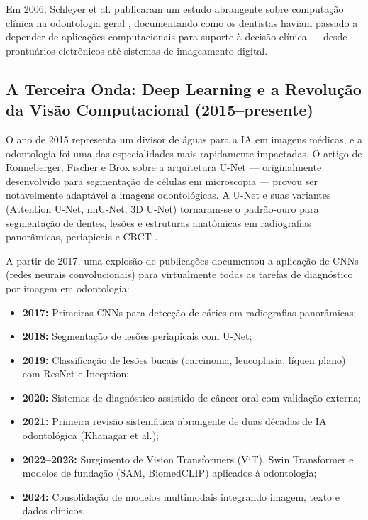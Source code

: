 Em 2006, Schleyer et al. publicaram um estudo abrangente sobre computação clínica na odontologia geral \cite{ODT-006}, documentando como os dentistas haviam passado a depender de aplicações computacionais para suporte à decisão clínica — desde prontuários eletrônicos até sistemas de imageamento digital.

\subsection{A Terceira Onda: Deep Learning e a Revolução da Visão Computacional (2015--presente)}

O ano de 2015 representa um divisor de águas para a IA em imagens médicas, e a odontologia foi uma das especialidades mais rapidamente impactadas. O artigo de Ronneberger, Fischer e Brox sobre a arquitetura U-Net \cite{ronneberger2015u} — originalmente desenvolvido para segmentação de células em microscopia — provou ser notavelmente adaptável a imagens odontológicas. A U-Net e suas variantes (Attention U-Net, nnU-Net, 3D U-Net) tornaram-se o padrão-ouro para segmentação de dentes, lesões e estruturas anatômicas em radiografias panorâmicas, periapicais e CBCT .

A partir de 2017, uma explosão de publicações documentou a aplicação de CNNs (redes neurais convolucionais) para virtualmente todas as tarefas de diagnóstico por imagem em odontologia:

\begin{itemize}
    \item \textbf{2017:} Primeiras CNNs para detecção de cáries em radiografias panorâmicas;
    \item \textbf{2018:} Segmentação de lesões periapicais com U-Net;
    \item \textbf{2019:} Classificação de lesões bucais (carcinoma, leucoplasia, líquen plano) com ResNet e Inception;
    \item \textbf{2020:} Sistemas de diagnóstico assistido de câncer oral com validação externa;
    \item \textbf{2021:} Primeira revisão sistemática abrangente de duas décadas de IA odontológica (Khanagar et al.);
    \item \textbf{2022--2023:} Surgimento de Vision Transformers (ViT), Swin Transformer e modelos de fundação (SAM, BiomedCLIP) aplicados à odontologia;
    \item \textbf{2024:} Consolidação de modelos multimodais integrando imagem, texto e dados clínicos.
\end{itemize}

